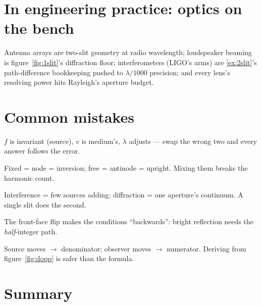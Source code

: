 \section{In engineering practice: optics on the bench}\label{sec:wav-eng}

Antenna arrays are two-slit geometry at radio wavelength; loudspeaker
beaming is figure~\ref{fig:1slit}'s diffraction floor; interferometers
(LIGO's arms) are \ref{ex:2slit}'s path-difference bookkeeping pushed
to $\lambda/1000$ precision; and every lens's resolving power hits
Rayleigh's aperture budget.

\section{Common mistakes}\label{sec:wav-mistakes}

\begin{tripwire}[$v=\lambda f$ misused across media]
$f$ is invariant (source), $v$ is medium's, $\lambda$ adjusts --- swap
the wrong two and every answer follows the error.
\end{tripwire}
\begin{tripwire}
Fixed = node = inversion; free = antinode = upright. Mixing them
breaks the harmonic count.
\end{tripwire}
\begin{tripwire}
Interference = few sources adding; diffraction = one aperture's
continuum. A single slit does the second.
\end{tripwire}
\begin{tripwire}
The front-face flip makes the conditions ``backwards'': bright
reflection needs the \emph{half}-integer path.
\end{tripwire}
\begin{tripwire}
Source moves $\to$ denominator; observer moves $\to$ numerator.
Deriving from figure~\ref{fig:dopp} is safer than the formula.
\end{tripwire}

\section{Summary}\label{sec:wav-summary}

